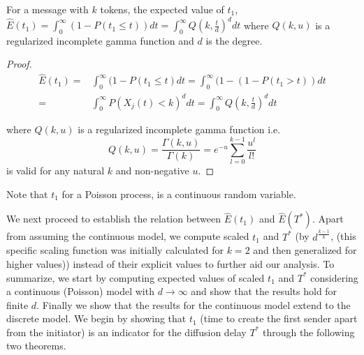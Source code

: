 \begin{theorem}
For a message with $k$ tokens, the expected value of $t_1$, 
$\hat E(t_{1})=\int_{0}^{\infty}(1-P(t_{1}\leq
t))dt = \int_{0}^{\infty}Q(k,\frac{t}
{d})^{d}dt$
where $Q(k,u)$ is a regularized incomplete gamma function and $d$ is the degree. 
\label{theorem-0}
\end{theorem}

\begin{proof}
 \begin{equation}
\begin{aligned} 
\hat E(t_{1})=&\int_{0}^{\infty}(1-P(t_{1}\leq
t)dt=\int_{0}^{\infty}(1-(1-P(t_{1}
>t))dt\\=&\int_{0}^{\infty}P(X_{j}(t)<k)^{d}dt=\int_{0}^{\infty}Q(k,\frac{t}
{d})^{d}dt\label{eqint} 
\end{aligned}
\end{equation}

where $Q(k,u)$ is a regularized incomplete gamma function i.e. 
\begin{equation}
Q(k,u)=\frac{\Gamma(k,u)}{\Gamma(k)}=e^{-u}\sum_{l=0}^{k-1}\frac{u^{l}}{l!}
\end{equation}
is valid for any natural $k$ and non-negative $u$.

\end{proof}

Note that $t_{1}$ for a Poisson process, is a continuous random variable. 

 We next proceed to establish the relation between $\hat E(t_1)$ and $\hat E(T^{*})$. Apart from assuming the continuous model, 
we compute scaled $t_1$ and $T^{*}$ (by $d^{\frac{k-1}{k}}$, 
(this specific scaling function was initially calculated for $k=2$ and then generalized for higher values)) instead of their explicit values to further aid our analysis. 
To summarize, we start by computing  
expected values of scaled $t_1$ and $T^{*}$ considering a continuous (Poisson) model with $d\rightarrow \infty$ and show that the results hold for finite $d$. Finally we show that the results for the continuous model extend to the discrete model.
We begin by showing that $t_1$ (time to create the first sender apart from the initiator) is an indicator for the diffusion delay $T^*$ through the following two theorems. 


